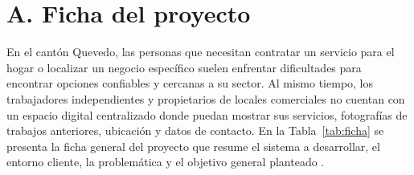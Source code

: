 \documentclass[11pt,a4paper]{article}
\begin{document}
\section*{A. Ficha del proyecto}

En el cant\'on Quevedo, las personas que necesitan contratar un servicio para el hogar o localizar un negocio específico suelen enfrentar dificultades para encontrar opciones confiables y cercanas a su sector. Al mismo tiempo, los trabajadores independientes y propietarios de locales comerciales no cuentan con un espacio digital centralizado donde puedan mostrar sus servicios, fotograf\'ias de trabajos anteriores, ubicaci\'on y datos de contacto. En la Tabla~\ref{tab:ficha} se presenta la ficha general del proyecto que resume el sistema a desarrollar, el entorno cliente, la problem\'atica y el objetivo general planteado \cite{iso29148}.
\end{document}

